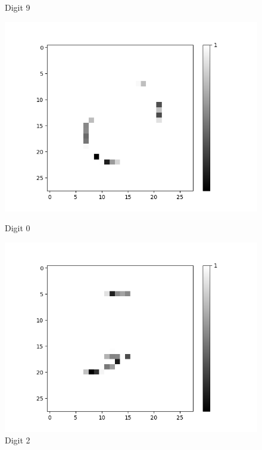 \begin{figure}[H]
\begin{minipage}[b]{0.19\textwidth}
		\caption{Digit 9}
	\end{minipage}
	\hfill
	\begin{minipage}[b]{0.19\textwidth}
		\includegraphics[width=\textwidth]{AND-OLD(NO-LSM)/Layer0-Neuron-0.png}
		\caption{Digit 0}
	\end{minipage}
	\begin{minipage}[b]{0.19\textwidth}
		\includegraphics[width=\textwidth]{AND-OLD(NO-LSM)/Layer0-Neuron-2.png}
		\caption{Digit 2}
	\end{minipage}
	\begin{minipage}[b]{0.19\textwidth}

\end{minipage}
\end{figure}
